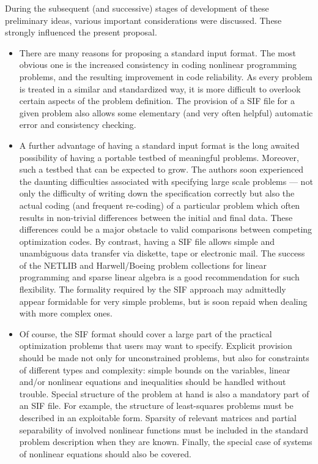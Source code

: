 \documentclass[a4paper]{article}
\begin{document}
During the subsequent (and successive)  stages of development of these
preliminary ideas,  various important considerations  were  discussed.
These strongly influenced the present proposal.

\begin{itemize}
\item
There are many  reasons for  proposing  a standard input  format.  The
most obvious  one  is  the increased consistency    in  coding
nonlinear programming problems, and the resulting improvement  in code
reliability. As every problem is treated in a similar and standardized
way, it is more difficult to  overlook  certain aspects of the problem
definition.  The  provision of a SIF  file for a given  problem also
allows some  elementary (and very  often helpful) automatic  error and
consistency checking.


\item
A  further advantage of   having a standard input format   is the long
awaited  possibility  of having  a  portable  testbed   of  meaningful
problems.  Moreover,  such a testbed that  can  be  expected  to grow.  The
authors  soon experienced  the daunting   difficulties associated with
specifying large  scale  problems ---  not  only the   difficulty  of
writing down  the specification correctly but also  the  actual coding
(and frequent  re-coding) of a particular problem  which often results
in non-trivial differences between the initial and  final data.  These
differences could be a   major obstacle to  valid comparisons  between
competing optimization codes.  By contrast, having a SIF file allows
simple and unambiguous data transfer via  diskette, tape or electronic
mail. The success of the NETLIB and Harwell/Boeing problem collections
for linear  programming and sparse linear algebra   \cite{Gay85,DuffGrimLewi89}
  is a  good   recommendation  for  such
flexibility.   The  formality  required   by  the  SIF   approach may
admittedly appear formidable  for very simple  problems,  but is  soon
repaid when dealing with more complex ones.

\item
Of course, the SIF format should cover a large  part of the practical
optimization  problems  that users  may   want  to specify.   Explicit
provision should be made not only for unconstrained problems, but also
for constraints of different types  and complexity: simple  bounds  on
the variables,
linear  and/or  nonlinear  equations and  inequalities
should be handled without trouble. Special structure
of the problem at
hand is  also a  mandatory  part of  an  SIF  file. For example,  the
structure   of  least-squares
problems must  be   described  in  an
exploitable   form.   Sparsity
of  relevant  matrices  and   partial separability
of involved  nonlinear functions must be  included in the
standard problem   description   when  they  are known.   Finally, the
special case of systems of nonlinear equations should also be covered.


\end{itemize}
\end{document}
